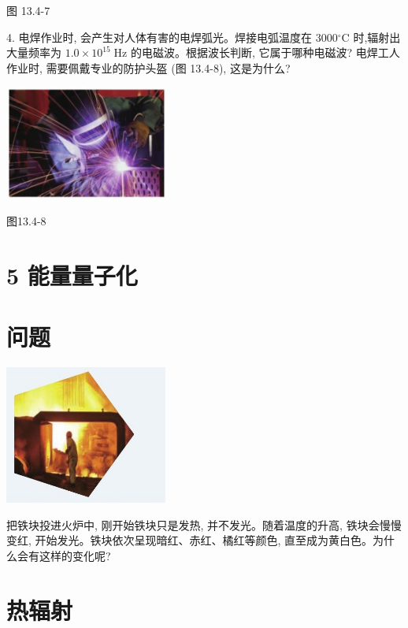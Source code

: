 \documentclass[10pt]{article}
\begin{document}
图 13.4-7

4. 电焊作业时, 会产生对人体有害的电焊弧光。焊接电弧温度在 \({3000}{}^{ \circ }\mathrm{C}\) 时,辐射出大量频率为 \({1.0} \times {10}^{15}\mathrm{\;{Hz}}\) 的电磁波。根据波长判断, 它属于哪种电磁波? 电焊工人作业时, 需要佩戴专业的防护头盔 (图 13.4-8), 这是为什么?

\begin{center}
\includegraphics[max width=0.4\textwidth]{images/01911d5f-8e38-70c0-b5b8-2b399bd115b6_128_368002.jpg}
\end{center}

图13.4-8

\section*{5 能量量子化}

\section*{问题}

\begin{center}
\includegraphics[max width=0.4\textwidth]{images/01911d5f-8e38-70c0-b5b8-2b399bd115b6_129_654983.jpg}
\end{center}

把铁块投进火炉中, 刚开始铁块只是发热, 并不发光。随着温度的升高, 铁块会慢慢变红, 开始发光。铁块依次呈现暗红、赤红、橘红等颜色, 直至成为黄白色。为什么会有这样的变化呢?

\section*{热辐射}
\end{document}
